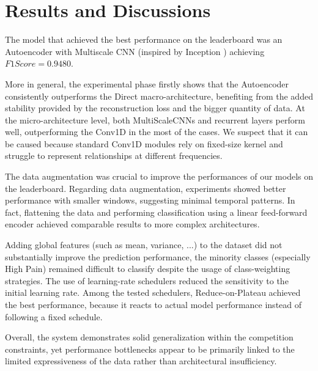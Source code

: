 \vspace{-15pt}
\section{Results and Discussions}
\vspace{-10pt}
The model that achieved the best performance on the leaderboard was an Autoencoder with Multiscale CNN (inspired by Inception \cite{DBLP:journals/corr/SzegedyLJSRAEVR14}) achieving $F1Score = 0.9480$.

More in general, the experimental phase firstly shows that the Autoencoder consistently outperforms the Direct macro-architecture, benefiting from the added stability provided by the reconstruction loss and the bigger quantity of data.
At the micro-architecture level, both MultiScaleCNNs and recurrent layers perform well, outperforming the Conv1D in the most of the cases. We suspect that it can be caused because standard Conv1D modules rely on fixed-size kernel and struggle to represent relationships at different frequencies.

The data augmentation was crucial to improve
the performances of our models on the leaderboard. Regarding data augmentation, experiments showed better performance with smaller windows, suggesting minimal temporal patterns. In fact, flattening the data and performing classification using a linear feed-forward encoder achieved comparable results to more complex architectures.

Adding global features (such as mean, variance, ...) to the dataset did not substantially improve the prediction performance, the minority classes (especially High Pain) remained difficult to classify despite the usage of class-weighting strategies.
The use of learning-rate schedulers reduced the sensitivity to the initial learning rate. Among the tested schedulers, Reduce-on-Plateau achieved the best performance, because it reacts to actual model performance instead of following a fixed schedule.

Overall, the system demonstrates solid generalization within the competition constraints, yet performance bottlenecks appear to be primarily linked to the limited expressiveness of the data rather than architectural insufficiency.
\vspace{-10pt}

